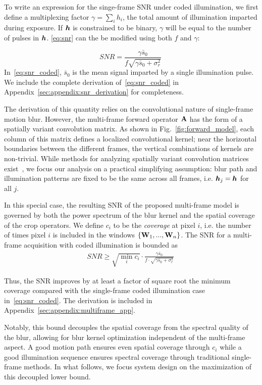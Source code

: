 To write an expression for the singe-frame SNR under coded illumination, we first define a multiplexing factor $\gamma=\sum_{i} h_i$, the total amount of illumination imparted during exposure. If $\bm{h}$ is constrained to be binary, $\gamma$ will be equal to the number of pulses in $\bm{h}$. \eqref{eq:snr} can the be modified using both $f$ and $\gamma$:

\begin{equation}
    \label{eq:snr_coded}
    SNR  = \frac{\gamma\bar{s}_0}{f\sqrt{\gamma\bar{s}_0 + \sigma^2_{r}}}\:
\end{equation}
In~\eqref{eq:snr_coded}, $\bar{s}_0$ is the mean signal imparted by a single illumination pulse. We include the complete derivation of~\eqref{eq:snr_coded} in Appendix~\ref{sec:appendix:snr_derivation} for completeness.

The derivation of this quantity relies on the convolutional nature of single-frame motion blur.
However, the multi-frame forward operator $\mathbf{A}$ has the form of a spatially variant convolution matrix. As shown in Fig.~\ref{fig:forward_model},
each column of this matrix defines a localized convolutional kernel; near the horizontal boundaries between the different frames, the vertical combinations of kernels are non-trivial.
While methods for analyzing spatially variant convolution matrices exist~\cite{chan2011bounds}, we focus our analysis on a practical simplifying assumption: blur path and illumination patterns are fixed to be the same across all frames, i.e. $\bm{h}_j=\bm{h}$ for all $j$.

In this special case, the resulting SNR of the proposed multi-frame model is governed by both the power spectrum of the blur kernel and the spatial coverage of the crop operators. We define $c_i$ to be the \textit{coverage} at pixel $i$, i.e. the number of times pixel $i$ is included in the windows $\{\mathbf{W}_1,...,\mathbf{W}_n\}$.
The SNR for a multi-frame acquisition with coded illumination is bounded as
\begin{align*}
    SNR  \geq \sqrt{
    \min_{i} c_i}  \cdot \frac{ \gamma\bar{s}_0}{f\cdot \sqrt{\gamma\bar{s}_0 + \sigma^2_{r}}}\:
\end{align*}

Thus, the SNR improves by at least a factor of square root the minimum coverage compared with the single-frame coded illumination case in~\eqref{eq:snr_coded}. The derivation is included in Appendix~\ref{sec:appendix:multiframe_app}.

Notably, this bound decouples the spatial coverage from the spectral quality of the blur, allowing for blur kernel optimization independent of the multi-frame aspect. A good motion path ensures even spatial coverage through $c_i$ while a good illumination sequence ensures spectral coverage through traditional single-frame methods. In what follows, we focus system design on the maximization of this decoupled lower bound.

